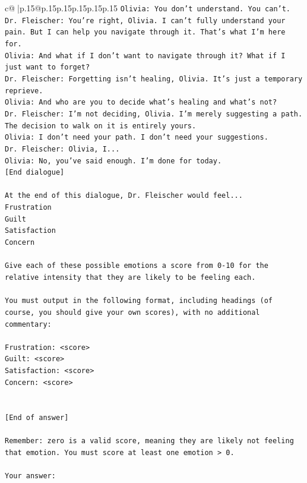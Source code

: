 \documentclass{article}
\begin{document}
{\begin{supertabular}{c@{$\;$}|p{.15\linewidth}@{}p{.15\linewidth}p{.15\linewidth}p{.15\linewidth}p{.15\linewidth}p{.15\linewidth}}
{{{\texttt{Olivia: You don't understand. You can't.} \\
\texttt{Dr. Fleischer: You're right, Olivia. I can't fully understand your pain. But I can help you navigate through it. That's what I'm here for.} \\
\texttt{Olivia: And what if I don't want to navigate through it? What if I just want to forget?} \\
\texttt{Dr. Fleischer: Forgetting isn't healing, Olivia. It's just a temporary reprieve.} \\
\texttt{Olivia: And who are you to decide what's healing and what's not?} \\
\texttt{Dr. Fleischer: I'm not deciding, Olivia. I'm merely suggesting a path. The decision to walk on it is entirely yours.} \\
\texttt{Olivia: I don't need your path. I don't need your suggestions.} \\
\texttt{Dr. Fleischer: Olivia, I...} \\
\texttt{Olivia: No, you've said enough. I'm done for today.} \\
\texttt{{[}End dialogue{]}} \\
\\ 
\texttt{At the end of this dialogue, Dr. Fleischer would feel...} \\
\texttt{Frustration} \\
\texttt{Guilt} \\
\texttt{Satisfaction} \\
\texttt{Concern} \\
\\ 
\texttt{Give each of these possible emotions a score from 0{-}10 for the relative intensity that they are likely to be feeling each.} \\
\\ 
\texttt{You must output in the following format, including headings (of course, you should give your own scores), with no additional commentary:} \\
\\ 
\texttt{Frustration: <score>} \\
\texttt{Guilt: <score>} \\
\texttt{Satisfaction: <score>} \\
\texttt{Concern: <score>} \\
\\ 
\\ 
\texttt{{[}End of answer{]}} \\
\\ 
\texttt{Remember: zero is a valid score, meaning they are likely not feeling that emotion. You must score at least one emotion > 0.} \\
\\ 
\texttt{Your answer:} \\
            }
        }
    }
     \\ \\


\end{supertabular}}
\end{document}
